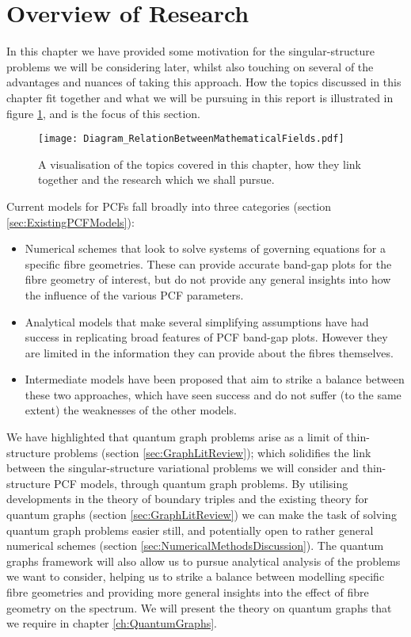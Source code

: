 \section{Overview of Research} \label{sec:ReportOverview}
In this chapter we have provided some motivation for the singular-structure problems we will be considering later, whilst also touching on several of the advantages and nuances of taking this approach.
How the topics discussed in this chapter fit together and what we will be pursuing in this report is illustrated in figure \ref{fig:Diagram_RelationBetweenMathematicalFields}, and is the focus of this section.
\begin{figure}[b!]
	\centering
	\texttt{[image: Diagram\_RelationBetweenMathematicalFields.pdf]}
	\caption{\label{fig:Diagram_RelationBetweenMathematicalFields} A visualisation of the topics covered in this chapter, how they link together and the research which we shall pursue.}
\end{figure}
Current models for PCFs fall broadly into three categories (section \ref{sec:ExistingPCFModels}):
\begin{itemize}
	\item Numerical schemes that look to solve systems of governing equations for a specific fibre geometries.
	These can provide accurate band-gap plots for the fibre geometry of interest, but do not provide any general insights into how the influence of the various PCF parameters.
	\item Analytical models that make several simplifying assumptions have had success in replicating broad features of PCF band-gap plots.
	However they are limited in the information they can provide about the fibres themselves.
	\item Intermediate models have been proposed that aim to strike a balance between these two approaches, which have seen success and do not suffer (to the same extent) the weaknesses of the other models.
\end{itemize}
We have highlighted that quantum graph problems arise as a limit of thin-structure problems (section \ref{sec:GraphLitReview}); which solidifies the link between the singular-structure variational problems we will consider and thin-structure PCF models, through quantum graph problems.
By utilising developments in the theory of boundary triples and the existing theory for quantum graphs (section \ref{sec:GraphLitReview}) we can make the task of solving quantum graph problems easier still, and potentially open to rather general numerical schemes (section \ref{sec:NumericalMethodsDiscussion}).
The quantum graphs framework will also allow us to pursue analytical analysis of the problems we want to consider, helping us to strike a balance between modelling specific fibre geometries and providing more general insights into the effect of fibre geometry on the spectrum.
We will present the theory on quantum graphs that we require in chapter \ref{ch:QuantumGraphs}. \newline

